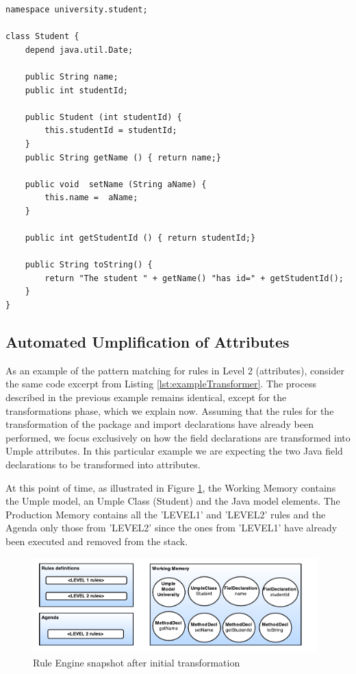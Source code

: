 \begin{lstlisting}[style=umpleOut, label=lst:level1exampleGenerator, caption=Umple code generated -- Level 1]
namespace university.student;

class Student {
	depend java.util.Date;
	
    public String name;
    public int studentId;
    
    public Student (int studentId) {
    	this.studentId = studentId;
    }
    public String getName () { return name;}
    
    public void  setName (String aName) { 
    	this.name =  aName;
    }
   
    public int getStudentId () { return studentId;}

    public String toString() {
    	return "The student " + getName() "has id=" + getStudentId();
    }
}   
\end{lstlisting}

\subsection{Automated Umplification of Attributes}

As an example of the pattern matching for rules in Level 2 (attributes), consider the same code excerpt from Listing \ref{lst:exampleTransformer}. The process described in the previous example remains identical, except for the transformations phase, which we explain now. Assuming that the rules for the transformation of the package and import declarations have already been performed, we focus exclusively on how the field declarations are transformed into Umple attributes. In this particular example we are expecting the two Java field declarations to be transformed into attributes. 

At this point of time, as illustrated in Figure \ref{fig:ruleModel2}, the Working Memory contains the Umple model, an Umple Class (Student) and the Java model elements. The Production Memory contains all the 'LEVEL1' and 'LEVEL2' rules and the Agenda only those from 'LEVEL2' since the ones from 'LEVEL1' have already been executed and removed from the stack.

\begin{figure}[h]
\centering
\includegraphics[width=0.98\textwidth]{Figures/ruleModel2.pdf}
\caption{Rule Engine snapshot after initial transformation}
\label{fig:ruleModel2}
\end{figure}

